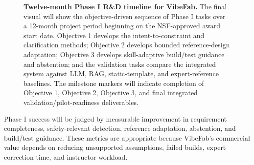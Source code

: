 \vspace{-4pt}
\begin{figure}[H]
\centering
{}
\caption{\textbf{Twelve-month Phase I R\&D timeline for VibeFab.} The final visual will show the objective-driven sequence of Phase I tasks over a 12-month project period beginning on the NSF-approved award start date. Objective 1 develops the intent-to-constraint and clarification methods; Objective 2 develops bounded reference-design adaptation; Objective 3 develops skill-adaptive build/test guidance and abstention; and the validation tasks compare the integrated system against LLM, RAG, static-template, and expert-reference baselines. The milestone markers will indicate completion of Objective 1, Objective 2, Objective 3, and final integrated validation/pilot-readiness deliverables.}
\label{fig:phase1_timeline}
\end{figure}


Phase I success will be judged by measurable improvement in requirement completeness, safety-relevant detection, reference adaptation, abstention, and build/test guidance. These metrics are appropriate because VibeFab's commercial value depends on reducing unsupported assumptions, failed builds, expert correction time, and instructor workload.

